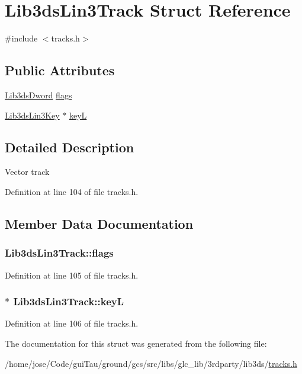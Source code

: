 \hypertarget{struct_lib3ds_lin3_track}{\section{Lib3ds\-Lin3\-Track Struct Reference}
\label{struct_lib3ds_lin3_track}
}


{\ttfamily \#include $<$tracks.\-h$>$}

\subsection*{Public Attributes}
\begin{DoxyCompactItemize}
\item 
\hyperlink{types_8h_a299c9663303144c562f6bd92c2f273d3}{Lib3ds\-Dword} \hyperlink{struct_lib3ds_lin3_track_afa2029108a64531b174520284a892435}{flags}
\item 
\hyperlink{struct_lib3ds_lin3_key}{Lib3ds\-Lin3\-Key} $\ast$ \hyperlink{struct_lib3ds_lin3_track_a2c835ef8e80999b0f4cda9b371084159}{key\-L}
\end{DoxyCompactItemize}


\subsection{Detailed Description}
Vector track 

Definition at line 104 of file tracks.\-h.



\subsection{Member Data Documentation}
\hypertarget{struct_lib3ds_lin3_track_afa2029108a64531b174520284a892435}{
\subsubsection[{flags}]{ Lib3ds\-Lin3\-Track\-::flags}}\label{struct_lib3ds_lin3_track_afa2029108a64531b174520284a892435}


Definition at line 105 of file tracks.\-h.

\hypertarget{struct_lib3ds_lin3_track_a2c835ef8e80999b0f4cda9b371084159}{
\subsubsection[{key\-L}]{$\ast$ Lib3ds\-Lin3\-Track\-::key\-L}}\label{struct_lib3ds_lin3_track_a2c835ef8e80999b0f4cda9b371084159}


Definition at line 106 of file tracks.\-h.



The documentation for this struct was generated from the following file\-:\begin{DoxyCompactItemize}
\item 
/home/jose/\-Code/gui\-Tau/ground/gcs/src/libs/glc\-\_\-lib/3rdparty/lib3ds/\hyperlink{tracks_8h}{tracks.\-h}\end{DoxyCompactItemize}
